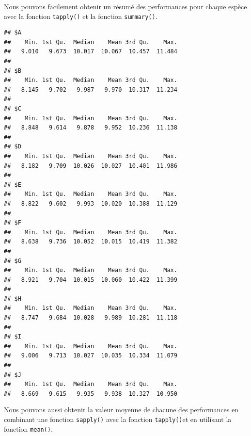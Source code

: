 \documentclass[]{book}
\newenvironment{Shaded}{\begin{snugshade}}{\end{snugshade}}
\newcommand{\ControlFlowTok}[1]{\textcolor[rgb]{0.13,0.29,0.53}{\textbf{#1}}}
\newcommand{\DataTypeTok}[1]{\textcolor[rgb]{0.13,0.29,0.53}{#1}}
\newcommand{\DecValTok}[1]{\textcolor[rgb]{0.00,0.00,0.81}{#1}}
\newcommand{\KeywordTok}[1]{\textcolor[rgb]{0.13,0.29,0.53}{\textbf{#1}}}
\newcommand{\NormalTok}[1]{#1}
\newcommand{\OperatorTok}[1]{\textcolor[rgb]{0.81,0.36,0.00}{\textbf{#1}}}
\begin{document}
Nous pouvons facilement obtenir un résumé des performances pour chaque espèce avec la fonction \texttt{tapply()} et la fonction \texttt{summary()}.

\begin{Shaded}
\end{Shaded}

\begin{verbatim}
## $A
##    Min. 1st Qu.  Median    Mean 3rd Qu.    Max. 
##   9.010   9.673  10.017  10.067  10.457  11.484 
## 
## $B
##    Min. 1st Qu.  Median    Mean 3rd Qu.    Max. 
##   8.145   9.702   9.987   9.970  10.317  11.234 
## 
## $C
##    Min. 1st Qu.  Median    Mean 3rd Qu.    Max. 
##   8.848   9.614   9.878   9.952  10.236  11.138 
## 
## $D
##    Min. 1st Qu.  Median    Mean 3rd Qu.    Max. 
##   8.182   9.709  10.026  10.027  10.401  11.986 
## 
## $E
##    Min. 1st Qu.  Median    Mean 3rd Qu.    Max. 
##   8.822   9.602   9.993  10.020  10.388  11.129 
## 
## $F
##    Min. 1st Qu.  Median    Mean 3rd Qu.    Max. 
##   8.638   9.736  10.052  10.015  10.419  11.382 
## 
## $G
##    Min. 1st Qu.  Median    Mean 3rd Qu.    Max. 
##   8.921   9.704  10.015  10.060  10.422  11.399 
## 
## $H
##    Min. 1st Qu.  Median    Mean 3rd Qu.    Max. 
##   8.747   9.684  10.028   9.989  10.281  11.118 
## 
## $I
##    Min. 1st Qu.  Median    Mean 3rd Qu.    Max. 
##   9.006   9.713  10.027  10.035  10.334  11.079 
## 
## $J
##    Min. 1st Qu.  Median    Mean 3rd Qu.    Max. 
##   8.669   9.615   9.935   9.938  10.327  10.950
\end{verbatim}

Nous pouvons aussi obtenir la valeur moyenne de chacune des performances en combinant une fonction \texttt{sapply()} avec la fonction \texttt{tapply()}et en utilisant la fonction \texttt{mean()}.

\begin{Shaded}
\end{Shaded}
\end{document}
